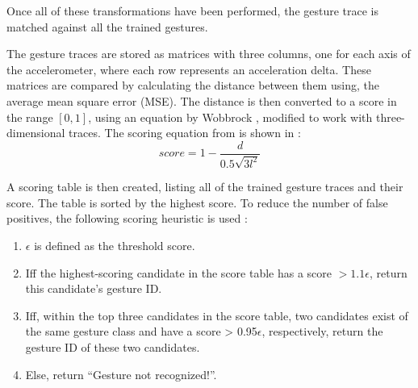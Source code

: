 Once all of these transformations have been performed, 
the gesture trace is matched against all the trained gestures. 

The gesture traces are stored as matrices with three columns, 
one for each axis of the accelerometer, 
where each row represents an acceleration delta.
These matrices are compared by calculating the distance between them using, 
the average mean square error (MSE).
The distance is then converted to a score in the range $[0,1]$, 
using an equation by Wobbrock \etal, 
modified to work with three-dimensional traces.
The scoring equation from \cite{threedollar} is shown in :
\begin{equation}\label{eq:gesture-scoring}
    score = 1-\frac{d}{0.5\sqrt{3l^2}}
\end{equation}

A scoring table is then created, 
listing all of the trained gesture traces and their score. 
The table is sorted by the highest score.
To reduce the number of false positives, 
the following scoring heuristic is used \cite{threedollar}:

\begin{enumerate}
	\item {$\epsilon$ is defined as the threshold score.}
	\item {Iff the highest-scoring candidate in the score table has a score $> 1.1\epsilon$, return this candidate’s gesture ID.}
	\item {Iff, within the top three candidates in the score table, two candidates exist of the same gesture class and have a score > 0.95$\epsilon$, respectively, return the gesture ID of these two candidates.}
	\item {Else, return ``Gesture not recognized!''.}
\end{enumerate}

